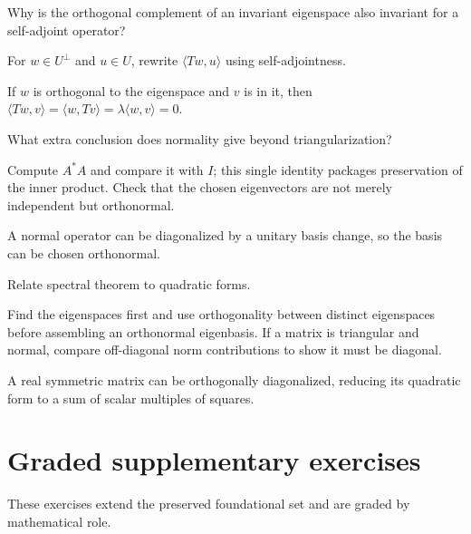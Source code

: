 \begin{exercise}\label{exr:i16-06}
Why is the orthogonal complement of an invariant eigenspace also invariant for a self-adjoint operator?
\end{exercise}
\begin{hint}
For \(w\in U^\perp\) and \(u\in U\), rewrite \(\langle Tw,u\rangle\) using self-adjointness.
\end{hint}
\begin{solution}
If $w$ is orthogonal to the eigenspace and $v$ is in it, then $\langle Tw,v\rangle=\langle w,Tv\rangle=\lambda\langle w,v\rangle=0$.
\end{solution}

\begin{exercise}\label{exr:i16-07}
What extra conclusion does normality give beyond triangularization?
\end{exercise}
\begin{hint}
Compute \(A^*A\) and compare it with \(I\); this single identity packages preservation of the inner product. Check that the chosen eigenvectors are not merely independent but orthonormal.
\end{hint}
\begin{solution}
A normal operator can be diagonalized by a unitary basis change, so the basis can be chosen orthonormal.
\end{solution}

\begin{exercise}\label{exr:i16-08}
Relate spectral theorem to quadratic forms.
\end{exercise}
\begin{hint}
Find the eigenspaces first and use orthogonality between distinct eigenspaces before assembling an orthonormal eigenbasis. If a matrix is triangular and normal, compare off-diagonal norm contributions to show it must be diagonal.
\end{hint}
\begin{solution}
A real symmetric matrix can be orthogonally diagonalized, reducing its quadratic form to a sum of scalar multiples of squares.
\end{solution}


\section{Graded supplementary exercises}
These exercises extend the preserved foundational set and are graded by mathematical role.

